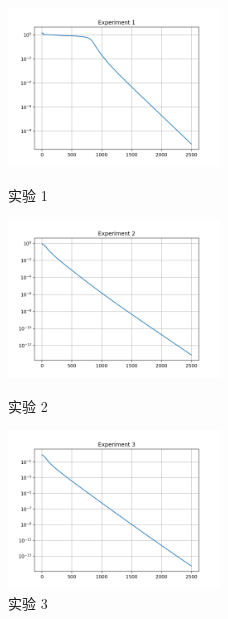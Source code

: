 \documentclass[12pt,letterpaper]{article}
\begin{document}
\begin{figure}
  \centering
  \includegraphics[width = 0.5\textwidth]{Figure_1.png}
  \caption{实验 1}
  \includegraphics[width = 0.5\textwidth]{Figure_2.png}
  \caption{实验 2}
  \includegraphics[width = 0.5\textwidth]{Figure_3.png}
  \caption{实验 3}
\end{figure}
\end{document}
